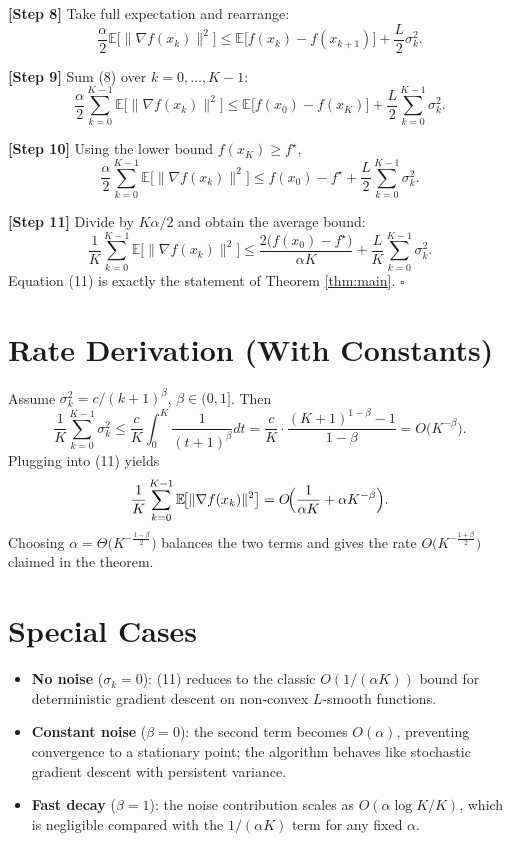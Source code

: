 \documentclass[11pt]{article}
\newcommand{\E}{\mathbb{E}}
\begin{document}
\noindent\textbf{[Step 8]} Take full expectation and rearrange:
\[
\frac{\alpha}{2}\E\!\bigl[\|\nabla f(x_{k})\|^{2}\bigr]
\le \E\!\bigl[f(x_{k})-f(x_{k+1})\bigr]+\frac{L}{2}\sigma_{k}^{2}.
\tag{8}
\]

\noindent\textbf{[Step 9]} Sum (8) over $k=0,\dots,K-1$:
\[
\frac{\alpha}{2}\sum_{k=0}^{K-1}\E\!\bigl[\|\nabla f(x_{k})\|^{2}\bigr]
\le \E\!\bigl[f(x_{0})-f(x_{K})\bigr]+\frac{L}{2}\sum_{k=0}^{K-1}\sigma_{k}^{2}.
\tag{9}
\]

\noindent\textbf{[Step 10]} Using the lower bound $f(x_{K})\ge f^{\star}$,
\[
\frac{\alpha}{2}\sum_{k=0}^{K-1}\E\!\bigl[\|\nabla f(x_{k})\|^{2}\bigr]
\le f(x_{0})-f^{\star}+\frac{L}{2}\sum_{k=0}^{K-1}\sigma_{k}^{2}.
\tag{10}
\]

\noindent\textbf{[Step 11]} Divide by $K\alpha/2$ and obtain the average bound:
\[
\frac{1}{K}\sum_{k=0}^{K-1}\E\!\bigl[\|\nabla f(x_{k})\|^{2}\bigr]
\le \frac{2\bigl(f(x_{0})-f^{\star}\bigr)}{\alpha K}
+\frac{L}{K}\sum_{k=0}^{K-1}\sigma_{k}^{2}.
\tag{11}
\]
Equation (11) is exactly the statement of Theorem \ref{thm:main}. \hfill $\square$

\section*{Rate Derivation (With Constants)}
Assume $\sigma_{k}^{2}=c/(k+1)^{\beta}$, $\beta\in(0,1]$. Then
\[
\frac{1}{K}\sum_{k=0}^{K-1}\sigma_{k}^{2}
\le \frac{c}{K}\int_{0}^{K}\frac{1}{(t+1)^{\beta}}dt
= \frac{c}{K}\cdot\frac{(K+1)^{1-\beta}-1}{1-\beta}
= O\!\bigl(K^{-\beta}\bigr).
\]
Plugging into (11) yields
\[
\frac{1}{K}\sum_{k=0}^{K-1}\E\!\bigl[\|\nabla f(x_{k})\|^{2}\bigr]
= O\!\Bigl(\frac{1}{\alpha K}+\alpha K^{-\beta}\Bigr).
\]
Choosing $\alpha = \Theta\bigl(K^{-\frac{1-\beta}{2}}\bigr)$ balances the two terms and gives the rate $O\bigl(K^{-\frac{1+\beta}{2}}\bigr)$ claimed in the theorem.

\section*{Special Cases}
\begin{itemize}
\item \textbf{No noise} ($\sigma_{k}=0$): (11) reduces to the classic $O(1/(\alpha K))$ bound for deterministic gradient descent on non‑convex $L$‑smooth functions.
\item \textbf{Constant noise} ($\beta=0$): the second term becomes $O(\alpha)$, preventing convergence to a stationary point; the algorithm behaves like stochastic gradient descent with persistent variance.
\item \textbf{Fast decay} ($\beta=1$): the noise contribution scales as $O(\alpha\log K /K)$, which is negligible compared with the $1/(\alpha K)$ term for any fixed $\alpha$.
\end{itemize}
\end{document}
